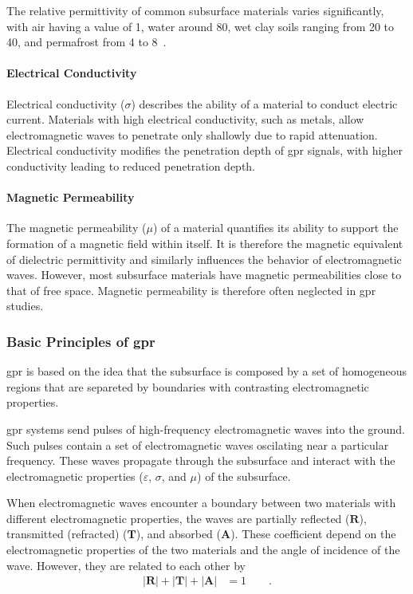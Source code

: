 The relative permittivity of common subsurface materials varies significantly, with air having a value of 1, water around 80, wet clay soils ranging from 20 to 40, and permafrost from 4 to 8~\citep{geoscidevelopersGroundPenetratingRadar2017}.

\paragraph{Electrical Conductivity}
Electrical conductivity (\(\sigma\)) describes the ability of a material to conduct electric current. 
Materials with high electrical conductivity, such as metals, allow electromagnetic waves to penetrate only shallowly due to rapid attenuation. 
Electrical conductivity modifies the penetration depth of \gls{gpr} signals, with higher conductivity leading to reduced penetration depth.

\paragraph{Magnetic Permeability}
The magnetic permeability (\(\mu\)) of a material quantifies its ability to support the formation of a magnetic field within itself. 
It is therefore the magnetic equivalent of dielectric permittivity and similarly influences the behavior of electromagnetic waves.
However, most subsurface materials have magnetic permeabilities close to that of free space. 
Magnetic permeability is therefore often neglected in \gls{gpr} studies.

\subsubsection{Basic Principles of \gls{gpr}}
\gls{gpr} is based on the idea that the subsurface is composed by a set of homogeneous regions that are separeted by boundaries with contrasting electromagnetic properties.

\gls{gpr} systems send pulses of high-frequency electromagnetic waves into the ground. 
Such pulses contain a set of electromagnetic waves oscilating near a particular frequency. 
These waves propagate through the subsurface and interact with the electromagnetic properties (\(\varepsilon\), \(\sigma\), and \(\mu\)) of the subsurface.

When electromagnetic waves encounter a boundary between two materials with different electromagnetic properties, the waves are partially reflected (\(\mathbf{R}\)), transmitted (refracted) (\(\mathbf{T}\)), and absorbed (\(\mathbf{A}\)).
These coefficient depend on the electromagnetic properties of the two materials and the angle of incidence of the wave. 
However, they are related to each other by 
\begin{align}
   |\mathbf{R}| + |\mathbf{T}| + |\mathbf{A}| &= 1\label{al:rtarelationship}\qquad .
\end{align}

